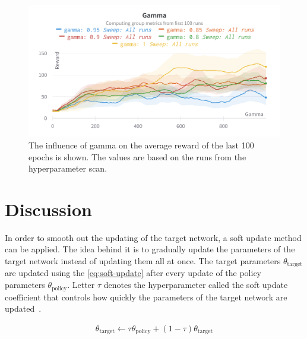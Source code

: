 \documentclass{article}
\begin{document}
\begin{figure}[ht!]
   \centering
   \includegraphics[width=\columnwidth]{assets/hyperparamter-scan/W&B Chart Gamma.png}
   \caption{The influence of gamma on the average reward of the last 100 epochs is shown. The values are based on the runs from the hyperparameter scan.
   }
   \label{fig:hyperparameter_scan_isolated_gamma}
\end{figure}

\section{Discussion}
\label{sec:discussion}


In order to smooth out the updating of the target network, a soft update method can be applied.
The idea behind it is to gradually update the parameters of the target network instead of updating them all at once.
The target parameters $\theta_{\text{target}}$ are updated using the \autoref{eq:soft-update} after every update of the policy
parameters $\theta_{\text{policy}}$.
Letter $\tau$ denotes the hyperparameter called the soft update coefficient that controls how quickly the parameters of
the target network are updated~\cite{kobayashi2021t}.

\begin{align}
   \label{eq:soft-update}
   \theta_{\text{target}} \leftarrow \tau \theta_{\text{policy}} + (1 - \tau) \theta_{\text{target}}
\end{align}

\end{document}
